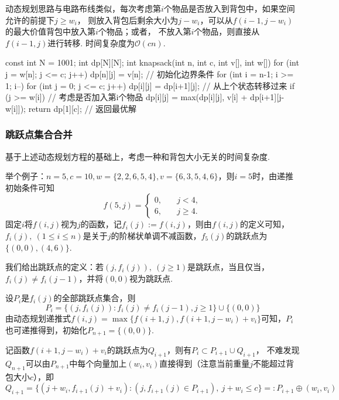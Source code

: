 \documentclass[12pt, a4paper, oneside]{ctexart}
\numberwithin{equation}{section}  %
\theoremstyle{definition}
\let\leq=\leqslant %
\let\geq=\geqslant %
\def\O{\mathcal{O}}         %
\def\del{\vspace{-1.5ex}}   %
\begin{document}
动态规划思路与电路布线类似，每次考虑第$i$个物品是否放入到背包中，如果空间允许的前提下$j\geq w_i$，
则放入背包后剩余大小为$j-w_i$，可以从$f(i-1,j-w_i)$的最大价值背包中放入第$i$个物品；或者，
不放入第$i$个物品，则直接从$f(i-1,j)$进行转移. 时间复杂度为$\O(cn)$.
\begin{cppcode}
const int N = 1001;
int dp[N][N];
int knapsack(int n, int c, int v[], int w[]) {
    for (int j = w[n]; j <= c; j++) dp[n][j] = v[n];  // 初始化边界条件
    for (int i = n-1; i >= 1; i--) {
        for (int j = 0; j <= c; j++) {
            dp[i][j] = dp[i+1][j];  // 从上个状态转移过来
            if (j >= w[i])  // 考虑是否加入第i个物品
                dp[i][j] = max(dp[i][j], v[i] + dp[i+1][j-w[i]]);
        }
    }
    return dp[1][c];  // 返回最优解
}
\end{cppcode}
\del\del
\subsubsection{跳跃点集合合并}
基于上述动态规划方程的基础上，考虑一种和背包大小无关的时间复杂度.

举个例子：$n=5,c=10,w = \{2,2,6,5,4\},v=\{6,3,5,4,6\}$，则$i=5$时，由递推初始条件可知\del
\begin{equation*}
    f(5, j) = \begin{cases}
        0,&\quad j < 4,\\
        6,&\quad j\geq 4.
    \end{cases}
\end{equation*}
固定$i$将$f(i,j)$视为$j$的函数，记$f_i(j) := f(i,j)$，则由$f(i,j)$的定义可知，
$f_i(j),\ (1\leq i\leq n)$是关于$j$的阶梯状单调不减函数，$f_5(j)$的跳跃点为$\{(0,0), (4,6)\}$. 

我们给出跳跃点的定义：若$(j, f_i(j)),\ (j\geq 1)$是跳跃点，当且仅当，
$f_i(j)\neq f_i(j-1)$，并将$(0,0)$视为跳跃点. 

设$P_i$是$f_i(j)$的全部跳跃点集合，则
\begin{equation*}
    P_i = \{(j, f_i(j)):f_i(j)\neq f_i(j-1), j\geq 1\}\cup\{(0, 0)\}
\end{equation*}
由动态规划递推式$f(i,j) = \max\{f(i+1,j),f(i+1,j-w_i)+v_i\}$可知，$P_i$也可递推得到，初始化$P_{n+1} = \{(0,0)\}$. 

记函数$f(i+1,j-w_i)+v_i$的跳跃点为$Q_{i+1}$，则有$P_i\subset P_{i+1}\cup Q_{i+1}$，
不难发现$Q_{n+1}$可以由$P_{n+1}$中每个向量加上$(w_i,v_i)$直接得到（注意当前重量$j$不能超过背包大小$c$），即
\begin{equation*}
    Q_{i+1} = \{(j+w_i,f_{i+1}(j)+v_i):(j,f_{i+1}(j)\in P_{i+1}),\ j+w_i\leq c\} =: P_{i+1}\oplus (w_i,v_i)
\end{equation*}
\end{document}
